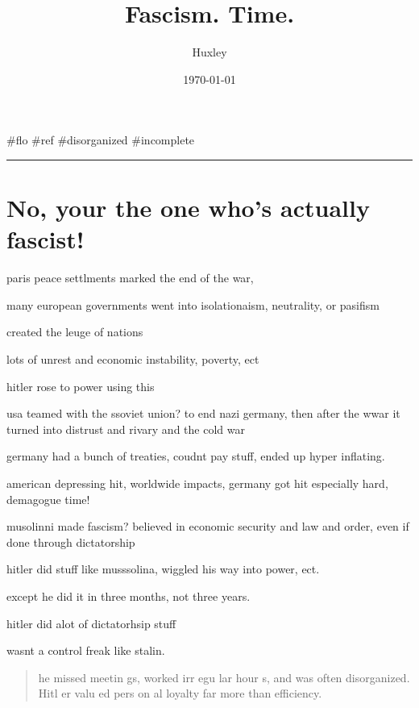 \documentclass[letterpaper]{article}
\author{Huxley}
\date{\today}
\title{Fascism. Time.}
\renewcommand\maketitle{}
\begin{document}
\maketitle
\#flo \#ref \#disorganized \#incomplete

\noindent\rule{\textwidth}{0.5pt}

\section{No, your the one who's actually fascist!}
\label{sec:orgc425af2}
paris peace settlments marked the end of the war,

many european governments went into isolationaism, neutrality, or
pasifism

created the leuge of nations

lots of unrest and economic instability, poverty, ect

hitler rose to power using this

usa teamed with the ssoviet union? to end nazi germany, then after the
wwar it turned into distrust and rivary and the cold war

germany had a bunch of treaties, coudnt pay stuff, ended up hyper
inflating.

american depressing hit, worldwide impacts, germany got hit especially
hard, demagogue time!

musolinni made fascism? believed in economic security and law and order,
even if done through dictatorship

hitler did stuff like musssolina, wiggled his way into power, ect.

except he did it in three months, not three years.

hitler did alot of dictatorhsip stuff

wasnt a control freak like stalin.

\begin{quote}
he missed meetin gs, worked irr egu lar hour s, and was often
disorganized. Hitl er valu ed pers on al loyalty far more than
efficiency.
\end{quote}
\end{document}
